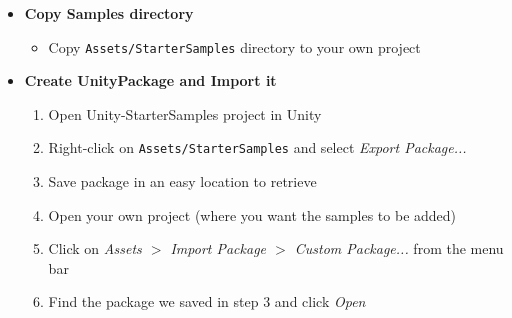 \documentclass{article}
\begin{document}
\begin{itemize}
    \item \textbf{Copy Samples directory}
    \begin{itemize}
        \item Copy \texttt{Assets/StarterSamples} directory to your own project
    \end{itemize}
    \item \textbf{Create UnityPackage and Import it}
    \begin{enumerate}
        \item Open Unity-StarterSamples project in Unity
        \item Right-click on \texttt{Assets/StarterSamples} and select \textit{Export Package...}
        \item Save package in an easy location to retrieve
        \item Open your own project (where you want the samples to be added)
        \item Click on \textit{Assets $>$ Import Package $>$ Custom Package...} from the menu bar
        \item Find the package we saved in step 3 and click \textit{Open}
    \end{enumerate}
\end{itemize}
\end{document}
